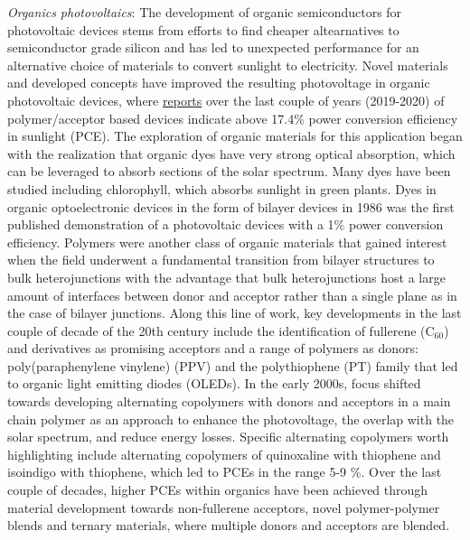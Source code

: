 \documentclass[book.tex]{subfiles}
\begin{document}
\textit{Organics photovoltaics}: The development of organic semiconductors for photovoltaic devices stems from efforts to find cheaper altearnatives to semiconductor grade silicon and has led to unexpected performance for an alternative choice of materials to convert sunlight to electricity.\cite{inganas2018organic} Novel materials and developed concepts have improved the resulting photovoltage in organic photovoltaic devices, where \href{https://www.nrel.gov/pv/insights/assets/pdfs/cell-pv-eff-emergingpv.pdf}{reports} over the last couple of years (2019-2020) of polymer/acceptor based devices indicate above 17.4\% power conversion efficiency in sunlight (PCE).\cite{zhao2017molecular, hou2018organic} The exploration of organic materials for this application began with the realization that organic dyes have very strong optical absorption, which can be leveraged to absorb sections of the solar spectrum. Many dyes have been studied\cite{merritt1976organic} including chlorophyll, which absorbs sunlight in green plants.\cite{tang1975transient,tang1975chlorophyll, tang1975photovoltaic, inganas1981charge, inganas1983photoelectrochemistry} Dyes in organic optoelectronic devices in the form of bilayer devices in 1986 was the first published demonstration of a photovoltaic devices with a 1\% power conversion efficiency.\cite{tang1986two} Polymers were another class of organic materials that gained interest when the field underwent a fundamental transition from bilayer structures to bulk heterojunctions with the advantage that bulk heterojunctions host a large amount of interfaces between donor and acceptor rather than a single plane as in the case of bilayer junctions. Along this line of work, key developments in the last couple of decade of the 20th century include the identification of fullerene (C$_{60}$)\cite{hummelen1995preparation} and derivatives as promising acceptors and a range of polymers as donors: poly(paraphenylene vinylene) (PPV)\cite{smilowitz1993photoexcitation} and the polythiophene (PT) family\cite{yohannes1998photoelectrochemical} that led to organic light emitting diodes (OLEDs).\cite{berggren1994light} In the early 2000s, focus shifted towards developing alternating copolymers\cite{blouin2008toward} with donors and acceptors in a main chain polymer as an approach to enhance the photovoltage, the overlap with the solar spectrum,
and reduce energy losses. Specific alternating copolymers worth highlighting include alternating
copolymers of quinoxaline with thiophene and isoindigo with thiophene, which led to PCEs in the range 5-9 \%.\cite{wang2013conformational,wang2011f} Over the last couple of decades, higher PCEs within organics have been achieved through material development towards non-fullerene acceptors, novel polymer-polymer blends and ternary materials, where multiple donors and acceptors are blended.\cite{inganas2018organic}
\end{document}
